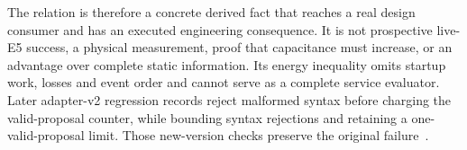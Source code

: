 The relation is therefore a concrete derived fact that reaches a real
design consumer and has an executed engineering consequence. It is not
prospective live-E5 success, a physical measurement, proof that capacitance
must increase, or an advantage over complete static information. Its
energy inequality omits startup work, losses and event order and cannot
serve as a complete service evaluator. Later adapter-v2 regression records
reject malformed syntax before charging the valid-proposal counter, while
bounding syntax rejections and retaining a one-valid-proposal limit. Those
new-version checks preserve the original failure~\cite{adapter}.
\FloatBarrier
